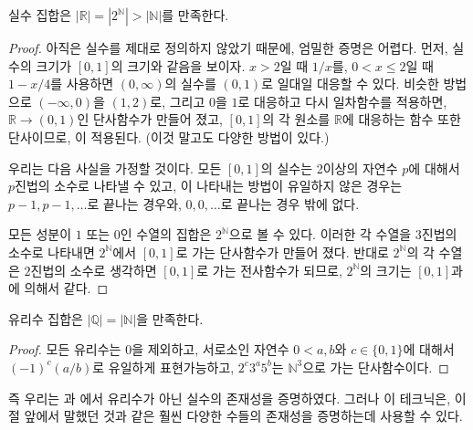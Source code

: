 \begin{theorem}
\label{thm:uctreal}
    실수 집합은 $|\mathbb{R}| = |2^\mathbb{N}| > |\mathbb{N}|$를 만족한다.
\end{theorem}
\begin{proof}
    아직은 실수를 제대로 정의하지 않았기 때문에, 엄밀한 증명은 어렵다.
    먼저, 실수의 크기가 $[0, 1]$의 크기와 같음을 보이자.
    $x > 2$일 때 $1/x$를, $0 < x \leq 2$일 때 $1 - x/4$를 사용하면 $(0, \infty)$의 실수를 $(0, 1)$로 일대일 대응할 수 있다.
    비슷한 방법으로 $(-\infty, 0)$을 $(1, 2)$로, 그리고 $0$을 $1$로 대응하고 다시 일차함수를 적용하면, $\mathbb{R} \to (0, 1)$인 단사함수가 만들어 졌고, $[0, 1]$의 각 원소를 $\mathbb{R}$에 대응하는 함수 또한 단사이므로, 이 적용된다.
    (이것 말고도 다양한 방법이 있다.)
    
    우리는 다음 사실을 가정할 것이다.
    모든 $[0, 1]$의 실수는 2이상의 자연수 $p$에 대해서 $p$진법의 소수로 나타낼 수 있고, 이 나타내는 방법이 유일하지 않은 경우는 $p - 1, p - 1, \dots$로 끝나는 경우와, $0, 0, \dots$로 끝나는 경우 밖에 없다.

    모든 성분이 $1$ 또는 $0$인 수열의 집합은 $2^\mathbb{N}$으로 볼 수 있다.
    이러한 각 수열을 $3$진법의 소수로 나타내면 $2^\mathbb{N}$에서 $[0, 1]$로 가는 단사함수가 만들어 졌다.
    반대로 $2^\mathbb{N}$의 각 수열은 $2$진법의 소수로 생각하면 $[0, 1]$로 가는 전사함수가 되므로, $2^\mathbb{N}$의 크기는 $[0, 1]$과 에 의해서 같다.
\end{proof}
\begin{theorem}
\label{thm:cntrat}
    유리수 집합은 $|\mathbb{Q}| = |\mathbb{N}|$을 만족한다.
\end{theorem}
\begin{proof}
    모든 유리수는 $0$을 제외하고, 서로소인 자연수 $0 < a, b$와 $c \in \{0, 1\}$에 대해서 $(-1)^c (a/b)$로 유일하게 표현가능하고, $2^c3^a5^b$는 $\mathbb{N}^3$으로 가는 단사함수이다.
\end{proof}
즉 우리는 과 에서 유리수가 아닌 실수의 존재성을 증명하였다.
그러나 이 테크닉은, 이 절 앞에서 말했던 것과 같은 훨씬 다양한 수들의 존재성을 증명하는데 사용할 수 있다.
